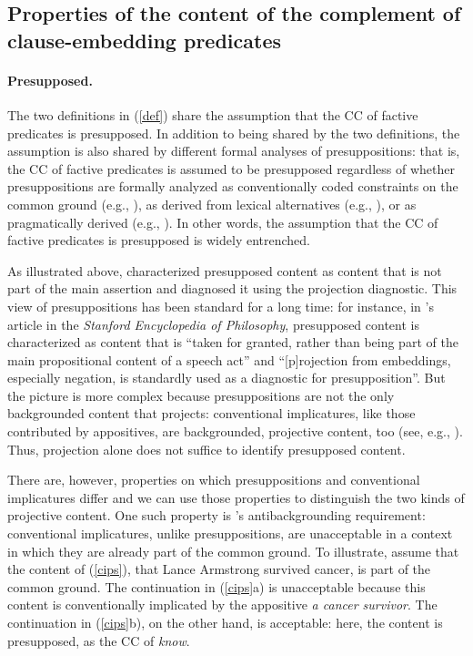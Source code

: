 \documentclass[11pt,fleqn]{article}
\newcommand{\6}{\mbox{$[\hspace*{-.6mm}[$}}
\newcommand{\9}{\mbox{$]\hspace*{-.6mm}]$}}
\newcommand{\citepos}[1]{\citeauthor{#1}'s \citeyear{#1}}
\begin{document}
\subsection{Properties of the content of the complement of clause-embedding predicates}\label{s12}
	
\paragraph{Presupposed.} The two definitions in (\ref{def}) share the assumption that the CC of factive predicates is presupposed. In addition to being shared by the two definitions, the assumption is also shared by different formal analyses of presuppositions: that is, the CC of factive predicates is assumed to be presupposed regardless of whether presuppositions are formally analyzed as conventionally coded constraints on the common ground (e.g., \citealt{heim83,vds92}), as derived from lexical alternatives (e.g., \citealt{abusch10, romoli2015}), or as pragmatically derived (e.g., \citealt{abrusan2011,best-question}). In other words, the assumption that the CC of factive predicates is presupposed is widely entrenched.

As illustrated above, \citealt{kiparsky-kiparsky70} characterized presupposed content as content that is not part of the main assertion and diagnosed it using the projection diagnostic. This view of presuppositions has been standard for a long time: for instance, in \citepos{beaver-geurts-sep} article in the {\em Stanford Encyclopedia of Philosophy}, presupposed content is characterized as content that is ``taken for granted, rather than being part of the main propositional content of a speech act'' and ``[p]rojection from embeddings, especially negation, is standardly used as a diagnostic for presupposition''. But the picture is more complex because presuppositions are not the only backgrounded content that projects: conventional implicatures, like those contributed by appositives, are backgrounded, projective content, too (see, e.g., \citealt{ccmg90,potts05}). Thus, projection alone does not suffice to identify presupposed content.

There are, however, properties on which presuppositions and conventional implicatures differ and we can use those properties to distinguish the two kinds of projective content. One such property is \citepos{potts05} antibackgrounding requirement: conventional implicatures, unlike presuppositions, are unacceptable in a context in which they are already part of the common ground. To illustrate, assume that the content of (\ref{cips}), that Lance Armstrong survived cancer, is part of the common ground. The continuation in (\ref{cips}a) is unacceptable because this content is conventionally implicated by the appositive {\em a cancer survivor}. The continuation in (\ref{cips}b), on the other hand, is acceptable: here, the content is presupposed, as the CC of {\em know}. 
\end{document}
